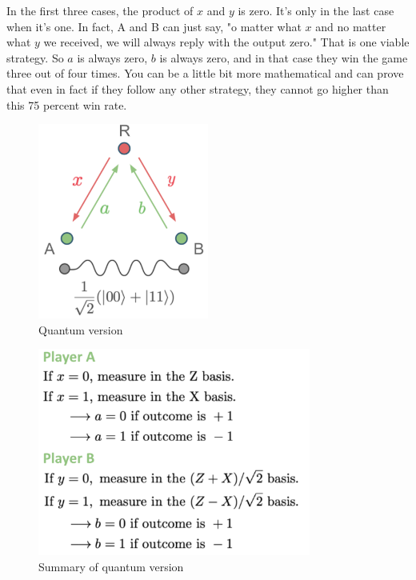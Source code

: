 In the first three cases, the product of $x$ and $y$ is zero. It's only in the last case when it's one. In fact, A and B can just say, "o matter what $x$ and no matter what $y$ we received, we will always reply with the output zero." That is one viable strategy. So $a$ is always zero, $b$ is always zero, and in that case they win the game three out of four times. You can be a little bit more mathematical and can prove that even in fact if they follow any other strategy, they cannot go higher than this 75 percent win rate. 


\begin{figure}[H]
    \centering
    \includegraphics[width=0.5\textwidth]{lesson4/CHSH_quantum_diagram.pdf}
        \caption{Quantum version}
    \label{fig:chsh-quantum}
\end{figure}

\begin{figure}[H]
    \centering
    \includegraphics[width=0.8\textwidth]{lesson4/CHSH_quantum_guide.pdf}
        \caption{Summary of quantum version}
    \label{fig:chsh-quantum-summary}
\end{figure}

